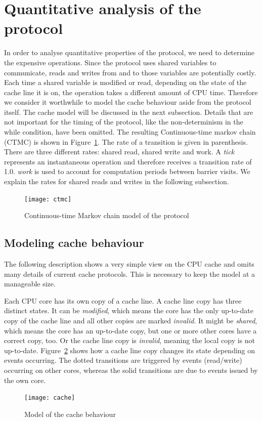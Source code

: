 \documentclass[a4paper, 10pt]{article}
\begin{document}
\section{Quantitative analysis of the protocol}
In order to analyse quantitative properties of the protocol, we need to determine the expensive operations. Since the protocol uses shared variables to communicate, reads and writes from and to those variables are potentially costly. Each time a shared variable is modified or read, depending on the state of the cache line it is on, the operation takes a different amount of CPU time. Therefore we consider it worthwhile to model the cache behaviour aside from the protocol itself. The cache model will be discussed in the next subsection. Details that are not important for the timing of the protocol, like the non-determinism in the while condition, have been omitted. The resulting Continuous-time markov chain (CTMC) is shown in Figure~\ref{fig:ctmc}. The rate of a transition is given in parenthesis. There are three different rates: shared read, shared write and work. A \emph{tick} represents an instantaneous operation and therefore receives a transition rate of 1.0. \emph{work} is used to account for computation periods between barrier visits. We explain the rates for shared reads and writes in the following subsection.
\begin{figure}[htb]
	\centering
	\texttt{[image: ctmc]}
	\caption{Continuous-time Markov chain model of the protocol}
	\label{fig:ctmc}
\end{figure}
\clearpage
\subsection{Modeling cache behaviour}
The following description shows a very simple view on the CPU cache and omits many details of current cache protocols. This is necessary to keep the model at a manageable size.

Each CPU core has its own copy of a cache line. A cache line copy has three distinct states. It can be \emph{modified}, which means the core has the only up-to-date copy of the cache line and all other copies are marked \emph{invalid}. It might be \emph{shared}, which means the core has an up-to-date copy, but one or more other cores have a correct copy, too. Or the cache line copy is \emph{invalid}, meaning the local copy is not up-to-date. Figure~\ref{fig:cache} shows how a cache line copy changes its state depending on events occurring. The dotted transitions are triggered by events (read/write) occurring on other cores, whereas the solid transitions are due to events issued by the own core.
\begin{figure}[htbp]
	\centering
	\texttt{[image: cache]}
	\caption{Model of the cache behaviour}
	\label{fig:cache}
\end{figure}
\end{document}
